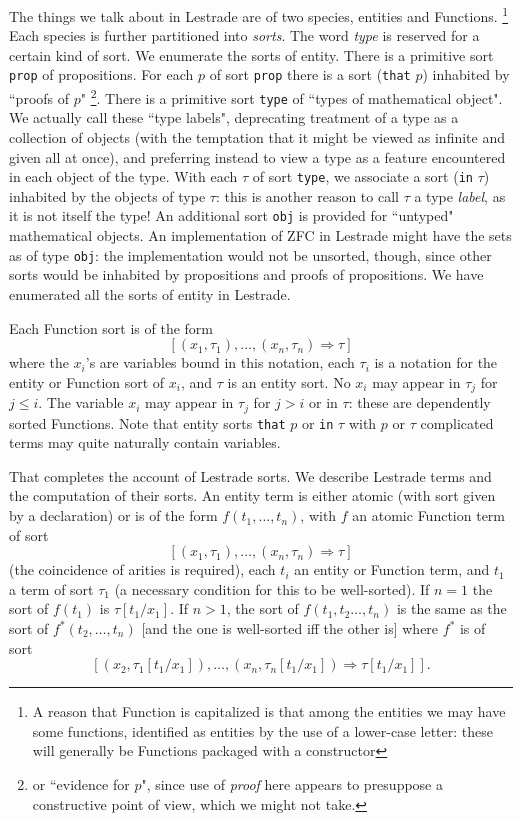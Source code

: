 \documentclass[submission,copyright,creativecommons]{eptcs}
\begin{document}
The things we talk about in Lestrade are of two species, entities and Functions.  \footnote{A reason that Function is capitalized is that among the entities we may have some functions, identified as entities by the use of a lower-case letter:  these will generally be Functions packaged with a constructor}  Each species is further partitioned into {\em sorts\/}.  The word {\em type\/} is reserved for a certain kind of sort.  We enumerate the sorts of entity.  There is a primitive sort {\tt prop} of propositions.  For each $p$ of sort
{\tt prop} there is a sort ({\tt that} $p$) inhabited by ``proofs of $p$" \footnote{or ``evidence for $p$", since use of {\em proof\/} here appears to presuppose a constructive point of view, which we might not take.}.  There is a primitive sort {\tt type\/} of ``types of mathematical object".  We actually call these ``type labels",  deprecating treatment of a type as a collection of objects (with the temptation that it might be viewed as infinite and given all at once), and preferring instead to view a type as a feature encountered in each object of the type.  With each $\tau$ of sort {\tt type}, we associate a sort ({\tt in} $\tau$) inhabited by the objects of type $\tau$:  this is another reason to call $\tau$ a type {\em label\/}, as it is not itself the type!  An additional sort {\tt obj} is provided for ``untyped" mathematical objects.  An implementation of ZFC in Lestrade might have the sets as of type {\tt obj}:  the implementation would not be unsorted, though, since other sorts would be inhabited by propositions and proofs of propositions.  We have enumerated all the sorts of entity in Lestrade.

Each Function sort is of the form $$[(x_1,\tau_1),\ldots,(x_n,\tau_n) \Rightarrow \tau]$$  where the $x_i$'s are variables bound in this notation, each $\tau_i$ is a notation for the entity or Function sort of $x_i$, and $\tau$ is an entity sort.  No $x_i$ may appear in $\tau_j$ for $j\leq i$.  The variable $x_i$ may appear in $\tau_j$ for $j>i$ or in $\tau$:  these are dependently sorted Functions.  Note that entity sorts {\tt that} $p$ or {\tt in} $\tau$ with $p$ or $\tau$ complicated terms may quite naturally contain variables.

That completes the account of Lestrade sorts.  We describe Lestrade terms and the computation of their sorts.  An entity term is either atomic (with  sort given by a declaration) or is of the form $f(t_1,\ldots,t_n)$, with $f$ an atomic Function term of sort
$$[(x_1,\tau_1),\ldots,(x_n,\tau_n) \Rightarrow \tau]$$ (the coincidence of arities is required), each $t_i$ an entity or Function term, and $t_1$ a term of sort $\tau_1$ (a necessary condition for this to be well-sorted).  If $n=1$ the sort
of $f(t_1)$ is $\tau[t_1/x_1]$.  If $n>1$, the sort of $f(t_1,t_2\ldots,t_n)$ is the same as the sort of $f^*(t_2,\ldots,t_n)$ [and the one is well-sorted iff the other is] where $f^*$ is of sort
$$[(x_2,\tau_1[t_1/x_1]),\ldots,(x_n,\tau_n[t_1/x_1]) \Rightarrow \tau[t_1/x_1]].$$
\end{document}
